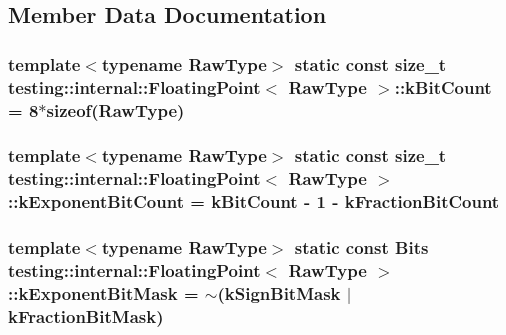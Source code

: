 \subsection{Member Data Documentation}
\hypertarget{classtesting_1_1internal_1_1_floating_point_ad730b49e322aec20c46ebf017a106afc}{
\subsubsection[{k\-Bit\-Count}]{\setlength{\rightskip}{0pt plus 5cm}template$<$typename Raw\-Type$>$ static const size\-\_\-t {\bf testing\-::internal\-::\-Floating\-Point}$<$ Raw\-Type $>$\-::k\-Bit\-Count = 8$\ast$sizeof(Raw\-Type)\hspace{0.3cm}{\ttfamily [static]}}}\label{classtesting_1_1internal_1_1_floating_point_ad730b49e322aec20c46ebf017a106afc}
\hypertarget{classtesting_1_1internal_1_1_floating_point_a6a6c6f2dd2d6aa335034738290dd9506}{
\subsubsection[{k\-Exponent\-Bit\-Count}]{\setlength{\rightskip}{0pt plus 5cm}template$<$typename Raw\-Type$>$ static const size\-\_\-t {\bf testing\-::internal\-::\-Floating\-Point}$<$ Raw\-Type $>$\-::k\-Exponent\-Bit\-Count = {\bf k\-Bit\-Count} -\/ 1 -\/ {\bf k\-Fraction\-Bit\-Count}\hspace{0.3cm}{\ttfamily [static]}}}\label{classtesting_1_1internal_1_1_floating_point_a6a6c6f2dd2d6aa335034738290dd9506}
\hypertarget{classtesting_1_1internal_1_1_floating_point_a4f30cbc7629ed32999f97a4b614962f3}{
\subsubsection[{k\-Exponent\-Bit\-Mask}]{\setlength{\rightskip}{0pt plus 5cm}template$<$typename Raw\-Type$>$ static const {\bf Bits} {\bf testing\-::internal\-::\-Floating\-Point}$<$ Raw\-Type $>$\-::k\-Exponent\-Bit\-Mask = $\sim$({\bf k\-Sign\-Bit\-Mask} $\vert$ {\bf k\-Fraction\-Bit\-Mask})\hspace{0.3cm}{\ttfamily [static]}}}\label{classtesting_1_1internal_1_1_floating_point_a4f30cbc7629ed32999f97a4b614962f3}
